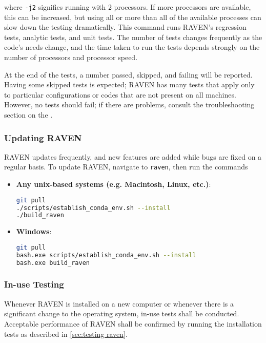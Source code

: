 where \texttt{-j2} signifies running with 2 processors.  If more processors are available, this can be
increased, but using all or more than all of the available processes can slow down the testing dramatically.
This command runs RAVEN's regression tests, analytic tests, and unit tests.  The number of tests changes
frequently as the code's needs change, and the time taken to run the tests depends strongly on the number of
processors and processor speed.

At the end of the tests, a number passed, skipped, and failing will be reported.  Having some skipped tests is
expected; RAVEN has many tests that apply only to particular configurations or codes that are not present on
all machines.  However, no tests should fail; if there are problems, consult the troubleshooting section on
the \wiki.


\subsubsection{Updating RAVEN}
RAVEN updates frequently, and new features are added while bugs are fixed on a regular basis.  To update
RAVEN, navigate to \texttt{raven}, then run the commands
\begin{itemize}

  \item \textbf{Any unix-based systems (e.g. Macintosh, Linux, etc.)}:
\begin{lstlisting}[language=bash]
git pull
./scripts/establish_conda_env.sh --install
./build_raven
\end{lstlisting}
  \item \textbf{Windows}:
  \begin{lstlisting}[language=bash]
git pull
bash.exe scripts/establish_conda_env.sh --install
bash.exe build_raven
\end{lstlisting}
  
\end{itemize}

\subsubsection{In-use Testing}
Whenever RAVEN is installed on a new computer or whenever there is a significant change to the operating system, 
in-use tests shall be conducted.
Acceptable performance of RAVEN shall be confirmed by running the installation tests as described in  \ref{sec:testing raven}.
